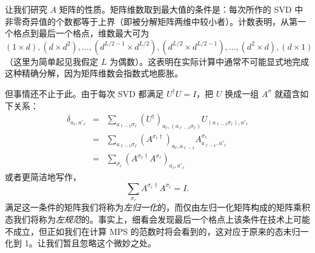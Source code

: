 \documentclass[a4paper,10pt,oneside,onecolumn,1p,times]{elsarticle}
\begin{document}
让我们研究 $A$ 矩阵的性质。矩阵维数取到最大值的条件是：每次所作的 SVD 中非零奇异值的个数都等于上界（即被分解矩阵两维中较小者）。计数表明，从第一个格点到最后一个格点，维数最大可为 $(1 \times d), (d \times d^2), \ldots, (d^{L/2-1} \times d^{L/2}), (d^{L/2} \times d^{L/2-1}), \ldots, (d^2 \times d), (d \times 1)$（这里为简单起见我假定 $L$ 为偶数）。这表明在实际计算中通常不可能显式地完成这种精确分解，因为矩阵维数会指数式地膨胀。

但事情还不止于此。由于每次 SVD 都满足 $U^\dagger U = I$，把 $U$ 换成一组 $A^\sigma$ 就蕴含如下关系：
\begin{eqnarray*}
\delta_{a_\ell,a'_\ell} &=& \sum_{a_{\ell-1}\sigma_\ell} (U^\dagger)_{a_\ell, (a_{\ell-1}\sigma_\ell)} U_{(a_{\ell-1}\sigma_\ell), a'_\ell} \\
&=& \sum_{a_{\ell-1}\sigma_\ell} (A^{\sigma_\ell\dagger})_{a_\ell, a_{\ell-1}} A^{\sigma_\ell}_{a_{\ell-1}, a'_\ell} \\
&=& \sum_{\sigma_\ell} ( A^{\sigma_\ell\dagger} A^{\sigma_\ell})_{a_\ell,a'_\ell} 
\end{eqnarray*}
或者更简洁地写作，
\begin{equation}
\sum_{\sigma_\ell} A^{\sigma_\ell \dagger} A^{\sigma_\ell} = I . 
\end{equation}
满足这一条件的矩阵我们将称为{\em 左归一化}的，而仅由左归一化矩阵构成的矩阵乘积态我们将称为{\em 左规范}的。事实上，细看会发现最后一个格点上该条件在技术上可能不成立，但正如我们在计算 MPS 的范数时将会看到的，这对应于原来的态未归一化到 1。让我们暂且忽略这个微妙之处。
\end{document}
